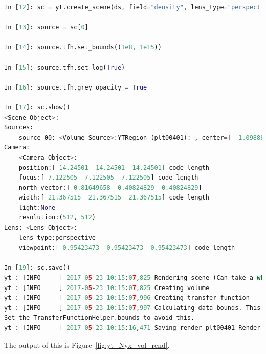 \begin{lstlisting}[language=python,breaklines=true]
In [12]: sc = yt.create_scene(ds, field="density", lens_type="perspective")

In [13]: source = sc[0]

In [14]: source.tfh.set_bounds((1e8, 1e15))

In [15]: source.tfh.set_log(True)

In [16]: source.tfh.grey_opacity = True

In [17]: sc.show()
<Scene Object>:
Sources:
    source_00: <Volume Source>:YTRegion (plt00401): , center=[  1.09888770e+25   1.09888770e+25   1.09888770e+25] cm, left_edge=[ 0.  0.  0.] cm, right_edge=[  2.19777540e+25   2.19777540e+25   2.19777540e+25] cm transfer_function:None
Camera:
    <Camera Object>:
	position:[ 14.24501  14.24501  14.24501] code_length
	focus:[ 7.122505  7.122505  7.122505] code_length
	north_vector:[ 0.81649658 -0.40824829 -0.40824829]
	width:[ 21.367515  21.367515  21.367515] code_length
	light:None
	resolution:(512, 512)
Lens: <Lens Object>:
	lens_type:perspective
	viewpoint:[ 0.95423473  0.95423473  0.95423473] code_length

In [19]: sc.save()
yt : [INFO     ] 2017-05-23 10:15:07,825 Rendering scene (Can take a while).
yt : [INFO     ] 2017-05-23 10:15:07,825 Creating volume
yt : [INFO     ] 2017-05-23 10:15:07,996 Creating transfer function
yt : [INFO     ] 2017-05-23 10:15:07,997 Calculating data bounds. This may take a while.  
Set the TransferFunctionHelper.bounds to avoid this.
yt : [INFO     ] 2017-05-23 10:15:16,471 Saving render plt00401_Render_density.png
\end{lstlisting}

The output of this is Figure~\ref{fig:yt_Nyx_vol_rend}.

